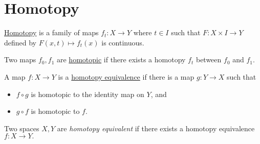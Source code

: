 \section{Homotopy} \label{sec:homotopy}

\begin{defn}[Homotopy]

	\underline{Homotopy} is a family of maps $f_t: X \to Y$ where $t \in I$ such that $F: X\times I \to Y$ defined by $F(x,t) \mapsto f_t(x)$ is continuous.
	
	Two maps $f_0, f_1$ are \underline{homotopic} if there exists a homotopy $f_t$ between $f_0$ and $f_1$.  
\end{defn}





\begin{defn}

A map $f:X \to Y$ is a \underline{homotopy equivalence} if there is a map $g: Y \to X$ such that 
\begin{itemize}
	\item $f\circ g$ is homotopic to the identity map on $Y$, and
	\item $g\circ f$ is homotopic to $f$.
\end{itemize}

Two spaces $X,Y$ are\textit{ homotopy equivalent} if there exists a homotopy equivalence $f: X \to Y. $
\end{defn}

